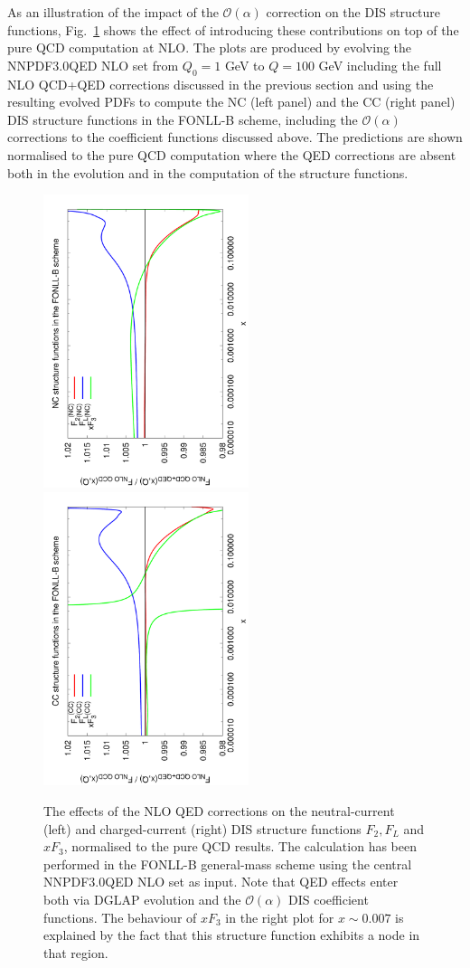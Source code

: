 As an illustration of the impact of the $\mathcal{O}(\alpha)$
correction on the DIS structure functions, Fig.~\ref{fig:StructFuncs}
shows the effect of introducing these contributions on top of the pure
QCD computation at NLO.
%
The plots are produced by evolving the
NNPDF3.0QED NLO set from $Q_0=1$ GeV to $Q=100$ GeV including the full
NLO QCD+QED corrections discussed in the previous section and using
the resulting evolved PDFs to compute the NC (left panel) and the CC
(right panel) DIS structure functions in the FONLL-B scheme, including
the $\mathcal{O}(\alpha)$ corrections to the coefficient functions
discussed above.
%
The predictions are shown normalised to the pure QCD computation where
the QED corrections are absent both in the evolution and in the
computation of the structure functions.

\begin{figure}[t]
\includegraphics[width=6cm,angle=270]{figs/NLOQEDCorrections_NC.pdf}
\includegraphics[width=6cm,angle=270]{figs/NLOQEDCorrections_CC.pdf}
\caption{The effects of the NLO QED corrections on the neutral-current
(left) and charged-current (right) DIS structure functions
$F_2, F_L$ and $xF_3$, normalised to the pure QCD results.
%
The calculation has been performed in the FONLL-B general-mass scheme using the
central NNPDF3.0QED NLO
set as input.
%
Note that QED effects enter both via DGLAP evolution and the
$\mathcal{O}(\alpha)$ DIS coefficient functions.
%
The behaviour of $xF_3$ in the right plot for $x\sim 0.007$ is explained
by the fact that this structure function exhibits a node in that region.
}
\label{fig:StructFuncs}
\end{figure}

